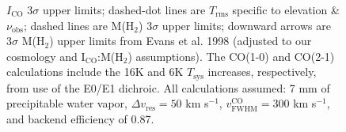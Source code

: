 \documentclass[11pt]{article}
\begin{document}
\begin{figure}[htp]
\begin{center}
{      $I_{\mathrm{CO}}$ $3\sigma$ upper limits; dashed-dot lines are
      $T_{\mathrm{rms}}$ specific to elevation \&
      $\nu_{\mathrm{obs}}$; dashed lines are M(H$_2$) $3\sigma$ upper
      limits; downward arrows are $3\sigma$ M(H$_2$) upper limits from
      Evans et al. 1998 (adjusted to our cosmology and
      I$_{\mathrm{CO}}$:M(H$_2$) assumptions). The CO(1-0) and CO(2-1)
      calculations include the 16K and 6K $T_{\mathrm{sys}}$
      increases, respectively, from use of the E0/E1 dichroic. All
      calculations assumed: 7 mm of precipitable water vapor, $\Delta
      v_{\mathrm{res}} = 50$ km s$^{-1}$,
      $v^{\mathrm{CO}}_{\mathrm{FWHM}} = 300$ km s$^{-1}$, and backend
      efficiency of 0.87.}
    \label{fig:feas}
  \end{center}
\end{figure}

\end{document}
